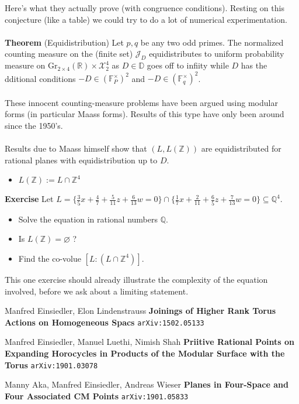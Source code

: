 \documentclass[12pt]{article}
\begin{document}
{\begin{itemize}
\end{itemize}
Here's what they actually prove (with congruence conditions).  Resting on this conjecture (like a table) we could try to do a lot of numerical experimentation. \\ \\
\textbf{Theorem} (Equidistribution) Let $p,q$ be any two odd primes.  The normalized counting measure on the (finite set) $\mathcal{J}_D$ equidistributes to uniform probability measure on 
$ \text{Gr}_{2 \times 4} (\mathbb{R}) \times \mathcal{X}_2^4$ 
as $D \in \mathbb{D}$ goes off to infiity while $D$ has the dditional conditions $-D \in (\mathbb{F}_P^\times)^2$ and $-D \in (\mathbb{F}_q^\times)^2$.  \\ \\
These innocent counting-measure problems have been argued using modular forms (in particular Maass forms).  Results of this type have only been around since the 1950's.   \\ \\
Results due to Maass himself show that $(L, L(\mathbb{Z})) $ are equidistributed for rational planes with equidistribution up to $D$. 
\begin{itemize}
\item $L(\mathbb{Z}):= L \cap \mathbb{Z}^4$
\end{itemize}
\textbf{Exercise} Let $L = \{ \frac{3}{5}x + \frac{4}{7} + \frac{5}{11}z + \frac{6}{13}w = 0  \}\cap \{ \frac{1}{7}x + \frac{2}{11} + \frac{6}{5}z + \frac{7}{13}w = 0  \}\subseteq \mathbb{Q}^4$. 
\begin{itemize}
\item Solve the equation in rational numbers $\mathbb{Q}$.
\item  Is $L(\mathbb{Z}) = \varnothing$ ? 
\item Find the co-volue $[L: (L \cap \mathbb{Z}^4)]$.
\end{itemize}
This one exercise should already illustrate the complexity of the equation involved, before we ask about a limiting statement.
\vfill

\begin{thebibliography}{}

\item Manfred Einsiedler, Elon Lindenstrauss \textbf{Joinings of Higher Rank Torus Actions on Homogeneous Spacs} \texttt{arXiv:1502.05133}
\item Manfred Einsiedler, Manuel Luethi, Nimish Shah \textbf{Priitive Rational Points on Expanding Horocycles in Products of the Modular Surface with the Torus} \texttt{arXiv:1901.03078} 
\item Manny Aka, Manfred Einsiedler, Andreas Wieser \textbf{Planes in Four-Space and Four Associated CM Points} \texttt{arXiv:1901.05833}
\end{thebibliography}
}
\end{document}
